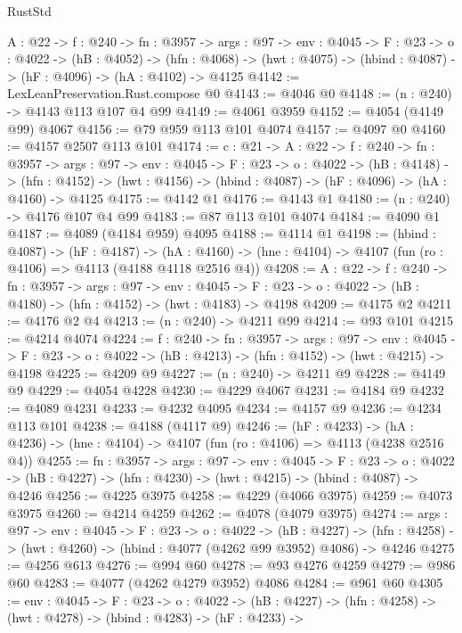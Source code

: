 \begin{lexlean}{RustStd}
\begin{coremodule}
{\begin{coremodule}
{{{{{{{{{  {A : @22} ->
  {f : @240} ->
  {fn : @3957} ->
  {args : @97} ->
  {env : @4045} ->
  {F : @23} ->
  {o : @4022} ->
  (hB : @4052) ->
  (hfn : @4068) -> (hwt : @4075) -> (hbind : @4087) -> (hF : @4096) -> (hA : @4102) -> @4125
@4142 := LexLeanPreservation.Rust.compose @0
@4143 := @4046 @0
@4148 := (n : @240) -> @4143 @113 @107 @4 @99
@4149 := @4061 @3959
@4152 := @4054 (@4149 @99) @4067
@4156 := @79 @959 @113 @101 @4074
@4157 := @4097 @0
@4160 := @4157 @2507 @113 @101
@4174 := {c : @21} ->
  {A : @22} ->
  {f : @240} ->
  {fn : @3957} ->
  {args : @97} ->
  {env : @4045} ->
  {F : @23} ->
  {o : @4022} ->
  (hB : @4148) ->
  (hfn : @4152) -> (hwt : @4156) -> (hbind : @4087) -> (hF : @4096) -> (hA : @4160) -> @4125
@4175 := @4142 @1
@4176 := @4143 @1
@4180 := (n : @240) -> @4176 @107 @4 @99
@4183 := @87 @113 @101 @4074
@4184 := @4090 @1
@4187 := @4089 (@4184 @959) @4095
@4188 := @4114 @1
@4198 := (hbind : @4087) ->
  (hF : @4187) ->
  (hA : @4160) -> (hne : @4104) -> @4107 (fun (ro : @4106) => @4113 (@4188 @4118 @2516 @4))
@4208 := {A : @22} ->
  {f : @240} ->
  {fn : @3957} ->
  {args : @97} ->
  {env : @4045} ->
  {F : @23} -> {o : @4022} -> (hB : @4180) -> (hfn : @4152) -> (hwt : @4183) -> @4198
@4209 := @4175 @2
@4211 := @4176 @2 @4
@4213 := (n : @240) -> @4211 @99
@4214 := @93 @101
@4215 := @4214 @4074
@4224 := {f : @240} ->
  {fn : @3957} ->
  {args : @97} ->
  {env : @4045} ->
  {F : @23} -> {o : @4022} -> (hB : @4213) -> (hfn : @4152) -> (hwt : @4215) -> @4198
@4225 := @4209 @9
@4227 := (n : @240) -> @4211 @9
@4228 := @4149 @9
@4229 := @4054 @4228
@4230 := @4229 @4067
@4231 := @4184 @9
@4232 := @4089 @4231
@4233 := @4232 @4095
@4234 := @4157 @9
@4236 := @4234 @113 @101
@4238 := @4188 (@4117 @9)
@4246 := (hF : @4233) ->
  (hA : @4236) -> (hne : @4104) -> @4107 (fun (ro : @4106) => @4113 (@4238 @2516 @4))
@4255 := {fn : @3957} ->
  {args : @97} ->
  {env : @4045} ->
  {F : @23} ->
  {o : @4022} -> (hB : @4227) -> (hfn : @4230) -> (hwt : @4215) -> (hbind : @4087) -> @4246
@4256 := @4225 @3975
@4258 := @4229 (@4066 @3975)
@4259 := @4073 @3975
@4260 := @4214 @4259
@4262 := @4078 (@4079 @3975)
@4274 := {args : @97} ->
  {env : @4045} ->
  {F : @23} ->
  {o : @4022} ->
  (hB : @4227) -> (hfn : @4258) -> (hwt : @4260) -> (hbind : @4077 (@4262 @99 @3952) @4086) -> @4246
@4275 := @4256 @613
@4276 := @994 @60
@4278 := @93 @4276 @4259
@4279 := @986 @60
@4283 := @4077 (@4262 @4279 @3952) @4086
@4284 := @961 @60
@4305 := {env : @4045} ->
  {F : @23} ->
  {o : @4022} ->
  (hB : @4227) ->
  (hfn : @4258) ->
  (hwt : @4278) ->
  (hbind : @4283) ->
  (hF : @4233) ->
}}}}}}}}}
\end{coremodule}}
\end{coremodule}
\end{lexlean}

